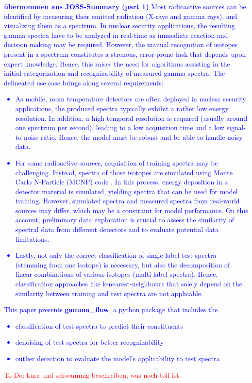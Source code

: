 \documentclass[preprint,12pt, a4paper]{elsarticle}
\begin{document}
\textcolor{blue}{\textbf{übernommen aus JOSS-Summary (part 1)}
Most radioactive sources can be identified by measuring their emitted radiation (X-rays and gamma rays), and visualizing them as a spectrum. In nuclear security applications, the resulting gamma spectra have to be analyzed in real-time as immediate reaction and decision making may be required. 
However, the manual recognition of isotopes present in a spectrum constitutes a 
strenous, error-prone task that depends upon expert knowledge. Hence, this raises 
the need for algorithms assisting in the initial categorization and recognizability 
of measured gamma spectra. 
The delineated use case brings along several requirements:  
\begin{itemize}
\item As mobile, room temperature detectors are often deployed in nuclear security applications, the produced spectra typically exhibit a rather low energy resolution. In addition, a high temporal resolution is required (usually around one spectrum per second), leading to a low acquisition time and a low signal-to-noise ratio. Hence, the model must be robust and be able to handle noisy data.  
\item For some radioactive sources, acquisition of training spectra may be challenging. Instead, 
spectra of those isotopes are simulated using Monte Carlo N-Particle (MCNP) code \cite{Kulesza2022}. In this process, 
energy deposition in a detector material is simulated, yielding spectra that can be used for 
model training. However, simulated spectra and measured spectra from real-world sources 
may differ, which may be a constraint for model performance. On this account, 
preliminary data exploration is crucial to assess the similarity of spectral data from 
different detectors and to evaluate potential data limitations.  
\item Lastly, not only the correct classification of single-label test spectra (stemming from 
one isotope) is necessary, but also the decomposition of linear combinations of various 
isotopes (multi-label spectra). Hence, classification approaches like k-nearest-neighbours 
that solely depend on the similarity between training and test spectra are not applicable.  
\end{itemize} 
This paper presents \textbf{gamma\_flow}, a python package that includes the
\begin{itemize}
\item classification of test spectra to predict their constituents   
\item denoising of test spectra for better recognizability   
\item outlier detection to evaluate the model's applicability to test spectra   
\end{itemize}
}
\textcolor{red}{To Do: kurz und schwammig beschreiben, was noch toll ist.}
\end{document}

